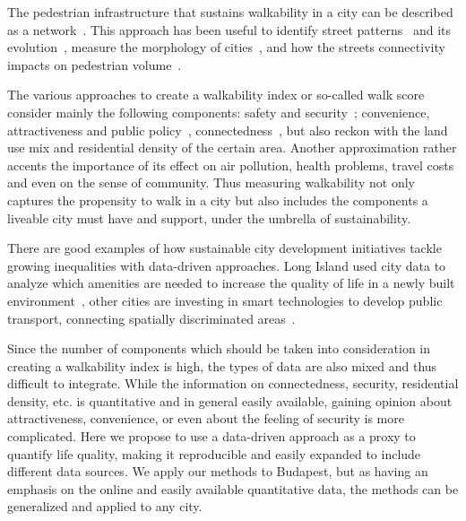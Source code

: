The pedestrian infrastructure that sustains walkability in a city can be described as a network~\cite{Porta2006Primal}. This approach has been useful to identify street patterns~\cite{Barthelemy2008Modeling,Louf2014Typology} and its evolution~\cite{Strano2012Evolution,Barthelemy2013Evolution}, measure the morphology of cities~\cite{Boeing2019Morphology}, and how the streets connectivity impacts on pedestrian volume~\cite{Hajrasouliha2015Impact}.

The various approaches to create a walkability index or so-called walk score consider mainly the following components: safety and security~\cite{Quercia2015Digital,Silva2018Investigating}; convenience, attractiveness and public policy~\cite{Krambeck2006Global,Speck2012Walkability}, connectedness~\cite{Southworth2005Designing}, but also reckon with the land use mix and residential density of the certain area\cite{Carr2010Walk}. Another approximation rather accents the importance of its effect on air pollution, health problems, travel costs and even on the sense of community\cite{Stephen2014Sustainable}. Thus measuring walkability not only captures the propensity to walk in a city but also includes the components a liveable city must have and support, under the umbrella of sustainability.

There are good examples of how sustainable city development initiatives tackle growing inequalities with data-driven approaches. Long Island used city data to analyze which amenities are needed to increase the quality of life in a newly built environment~\cite{Childs2018Planning}, other cities are investing in smart technologies to develop public transport, connecting spatially discriminated areas~\cite{Kaushik2017Planning,Fitzgerald2016Data}.

Since the number of components which should be taken into consideration in creating a walkability index is high, the types of data are also mixed and thus difficult to integrate. While the information on connectedness, security, residential density, etc. is quantitative and in general easily available, gaining opinion about attractiveness, convenience, or even about the feeling of security is more complicated. Here we propose to use a data-driven approach as a proxy to quantify life quality, making it reproducible and easily expanded to include different data sources. We apply our methods to Budapest, but as having an emphasis on the online and easily available quantitative data, the methods can be generalized and applied to any city.

